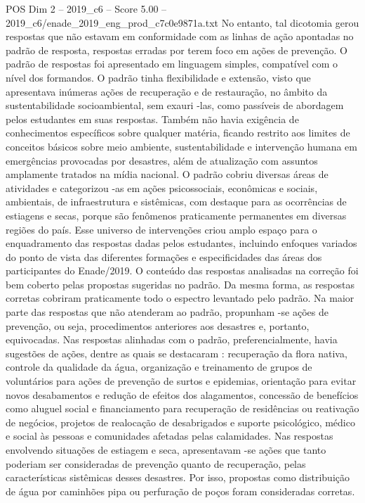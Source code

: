 \begin{textsample}{POS Dim 2 – 2019\_c6 – Score 5.00 – 2019\_c6/enade\_2019\_eng\_prod\_c7c0e9871a.txt}
No entanto, tal dicotomia gerou respostas que não estavam em conformidade com as linhas de ação apontadas no padrão de resposta, respostas erradas por terem foco em ações de prevenção.
O padrão de respostas foi apresentado em linguagem simples, compatível com o nível dos formandos.
O padrão tinha flexibilidade e extensão, visto que apresentava inúmeras ações de recuperação e de restauração, no âmbito da sustentabilidade socioambiental, sem exauri -las, como passíveis de abordagem pelos estudantes em suas respostas.
Também não havia exigência de conhecimentos específicos sobre qualquer matéria, ficando restrito aos limites de conceitos básicos sobre meio ambiente, sustentabilidade e intervenção humana em emergências provocadas por desastres, além de atualização com assuntos amplamente tratados na mídia nacional.
O padrão cobriu diversas áreas de atividades e categorizou -as em ações psicossociais, econômicas e sociais, ambientais, de infraestrutura e sistêmicas, com destaque para as ocorrências de estiagens e secas, porque são fenômenos praticamente permanentes em diversas regiões do país.
Esse universo de intervenções criou amplo espaço para o enquadramento das respostas dadas pelos estudantes, incluindo enfoques variados do ponto de vista das diferentes formações e especificidades das áreas dos participantes do Enade/2019.
O conteúdo das respostas analisadas na correção foi bem coberto pelas propostas sugeridas no padrão.
Da mesma forma, as respostas corretas cobriram praticamente todo o espectro levantado pelo padrão.
Na maior parte das respostas que não atenderam ao padrão, propunham -se ações de prevenção, ou seja, procedimentos anteriores aos desastres e, portanto, equivocadas.
Nas respostas alinhadas com o padrão, preferencialmente, havia sugestões de ações, dentre as quais se destacaram : recuperação da flora nativa, controle da qualidade da água, organização e treinamento de grupos de voluntários para ações de prevenção de surtos e epidemias, orientação para evitar novos desabamentos e redução de efeitos dos alagamentos, concessão de benefícios como aluguel social e financiamento para recuperação de residências ou reativação de negócios, projetos de realocação de desabrigados e suporte psicológico, médico e social às pessoas e comunidades afetadas pelas calamidades.
Nas respostas envolvendo situações de estiagem e seca, apresentavam -se ações que tanto poderiam ser consideradas de prevenção quanto de recuperação, pelas características sistêmicas desses desastres.
Por isso, propostas como distribuição de água por caminhões pipa ou perfuração de poços foram consideradas corretas.

\end{textsample}
